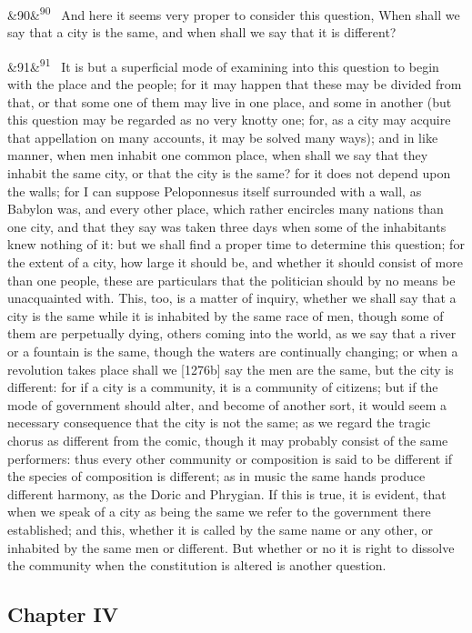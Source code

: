 \documentclass[12pt]{article}
\newcommand{\para}[1][]{\par\noindent\ifx&#1&\else\textsuperscript{\footnotesize #1}~\fi}
\begin{document}
\para[90] And here it seems very proper to consider this question, When shall we say that a city is the same, and when shall we say that it is different?

\para[91] It is but a superficial mode of examining into this question to begin with the place and the people; for it may happen that these may be divided from that, or that some one of them may live in one place, and some in another (but this question may be regarded as no very knotty one; for, as a city may acquire that appellation on many accounts, it may be solved many ways); and in like manner, when men inhabit one common place, when shall we say that they inhabit the same city, or that the city is the same? for it does not depend upon the walls; for I can suppose Peloponnesus itself surrounded with a wall, as Babylon was, and every other place, which rather encircles many nations than one city, and that they say was taken three days when some of the inhabitants knew nothing of it: but we shall find a proper time to determine this question; for the extent of a city, how large it should be, and whether it should consist of more than one people, these are particulars that the politician should by no means be unacquainted with. This, too, is a matter of inquiry, whether we shall say that a city is the same while it is inhabited by the same race of men, though some of them are perpetually dying, others coming into the world, as we say that a river or a fountain is the same, though the waters are continually changing; or when a revolution takes place shall we [1276b] say the men are the same, but the city is different: for if a city is a community, it is a community of citizens; but if the mode of government should alter, and become of another sort, it would seem a necessary consequence that the city is not the same; as we regard the tragic chorus as different from the comic, though it may probably consist of the same performers: thus every other community or composition is said to be different if the species of composition is different; as in music the same hands produce different harmony, as the Doric and Phrygian. If this is true, it is evident, that when we speak of a city as being the same we refer to the government there established; and this, whether it is called by the same name or any other, or inhabited by the same men or different. But whether or no it is right to dissolve the community when the constitution is altered is another question.

\subsection*{Chapter IV}
\end{document}
